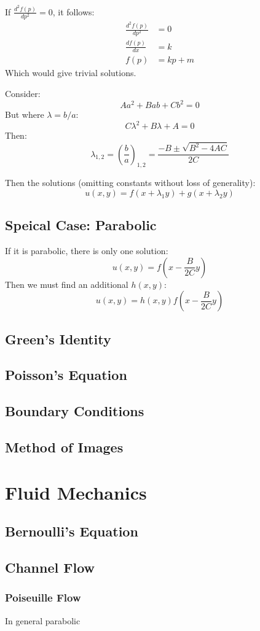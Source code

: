 \documentclass[12pt]{article}
\begin{document}
If $\frac{d^2f(p)}{dp^2} = 0$, it follows:
\begin{align*}
    \frac{d^2f(p)}{dp^2} &= 0\\
    \frac{df(p)}{dx} &= k\\
    f(p) &= kp + m
\end{align*}
Which would give trivial solutions.

Consider:
\[Aa^2+Bab +Cb^2=0\]
But where $\lambda = b/a$:
\[C\lambda^2 + B\lambda + A = 0\]
Then:
\[\lambda_{1,2}=\left(\frac{b}{a}\right)_{1,2}=\frac{-B\pm\sqrt{B^2-4AC}}{2C}\]

Then the solutions (omitting constants without loss of generality):
 \[ u(x,y) = f(x+\lambda_1 y)+g(x+\lambda_2y)\]

\subsection{Speical Case: Parabolic}
If it is parabolic, there is only one solution:
\[u(x,y) = f\left(x-\frac{B}{2C}y\right)\]
Then we must find an additional $h(x,y)$:
\[u(x,y) = h(x,y)f\left(x-\frac{B}{2C}y\right)\]

\subsection{Green's Identity}
\subsection{Poisson's Equation}
\subsection{Boundary Conditions}
\subsection{Method of Images}

\section{Fluid Mechanics}
\subsection{Bernoulli's Equation}
\subsection{Channel Flow}

\subsubsection{Poiseuille Flow}
In general parabolic
\end{document}
